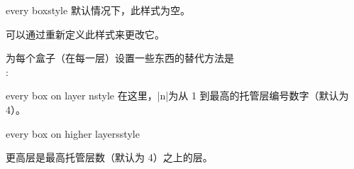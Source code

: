   
\begin{docTcbKey}{every box}{}{style}
  默认情况下，此样式为空。
  \begin{dispListing}
  \end{dispListing}
  可以通过重新定义此样式来更改它。
  \begin{dispListing}
  \end{dispListing}
  
  \medskip
  \begin{marker}
  为每个盒子（在每一层）设置一些东西的替代方法是\\
   :
  \begin{dispListing}
  \end{dispListing}
  \end{marker}
  \end{docTcbKey}




\begin{docTcbKey}{every box on layer n}{}{style}
  在这里，|n|为从 1 到最高的托管层编号数字（默认为 4）。
  \begin{dispListing}
  \end{dispListing}
  \end{docTcbKey}
  
  
  \begin{docTcbKey}{every box on higher layers}{}{style}
  
  更高层是最高托管层数（默认为 4）之上的层。
  \begin{dispListing}
  \end{dispListing}
  \end{docTcbKey}

